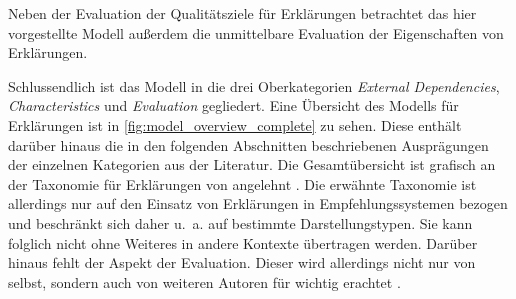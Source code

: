 Neben der Evaluation der Qualitätsziele für Erklärungen betrachtet das hier vorgestellte Modell außerdem die unmittelbare Evaluation der Eigenschaften von Erklärungen. 


\smallbreak

Schlussendlich ist das Modell in die drei Oberkategorien \textit{External Dependencies}, \textit{Characteristics} und \textit{Evaluation} gegliedert. Eine Übersicht des Modells für Erklärungen ist in \autoref{fig:model_overview_complete} zu sehen. Diese enthält darüber hinaus die in den folgenden Abschnitten beschriebenen Ausprägungen der einzelnen Kategorien aus der Literatur. Die Gesamtübersicht ist grafisch an der Taxonomie für Erklärungen von \citeauthor{nunes_systematic_2017} angelehnt \cite{nunes_systematic_2017}. Die erwähnte Taxonomie ist allerdings nur auf den Einsatz von Erklärungen in Empfehlungssystemen bezogen und beschränkt sich daher u.~a. auf bestimmte Darstellungstypen. Sie kann folglich nicht ohne Weiteres in andere Kontexte übertragen werden. Darüber hinaus fehlt der Aspekt der Evaluation. Dieser wird allerdings nicht nur von \citeauthor{nunes_systematic_2017} selbst, sondern auch von weiteren Autoren für wichtig erachtet \cite{cirqueira_scenario-based_2020, martin_evaluating_2021,nunes_systematic_2017}.

\newpage
\null
\vfill

